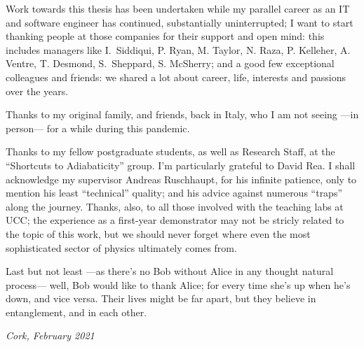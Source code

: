 {
\small
Work towards this thesis has been undertaken while my parallel career
as an IT and software engineer has continued,
substantially uninterrupted;
I want to start thanking people at those companies for their support and open mind:
this includes managers like
I.~Siddiqui, P. Ryan, M. Taylor, N. Raza, P. Kelleher, A. Ventre, T. Desmond, S.~Sheppard, S. McSherry;
and a good few exceptional colleagues and friends:
we shared a lot about career, life, interests and passions over the years.

Thanks to my original family, and friends, back in Italy,
who I am not seeing ---in person--- for a while during this pandemic.

Thanks to my fellow postgraduate students,
as well as Research Staff,
at the ``Shortcuts to Adiabaticity'' group.
I'm particularly grateful to David Rea.
I shall acknowledge my supervisor Andreas Ruschhaupt, for his infinite patience,
only to mention his least ``technical'' quality;
and his advice against numerous ``traps'' along the journey.
Thanks, also, to all those involved with the teaching labs at UCC;
the  experience as a  first-year demonstrator may not be stricly related to the topic of this work,
but we should never forget where even the most sophisticated sector of physics
ultimately comes from.

Last but not least ---as there's no Bob without Alice in any thought natural process---
well, Bob would like to thank Alice;
for every time she’s up when he’s down, and vice versa.
Their lives might be far apart, but they believe in entanglement, and in each other.

\textit{Cork, February 2021}
}